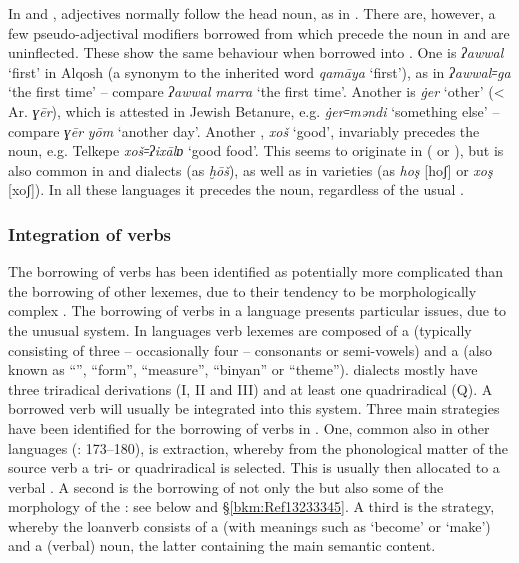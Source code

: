 \documentclass[output=paper]{langsci/langscibook}
\begin{document}
In  and , adjectives normally follow the head noun, as in . There are, however, a few pseudo-adjectival modifiers borrowed from  which precede the noun in  and are uninflected. These show the same behaviour when borrowed into . One is \textit{ʔawwal} ‘first’ in  Alqosh (a synonym to the inherited word \textit{qamāya} ‘first’), as in \textit{ʔawwal꞊ga} ‘the first time’ – compare  \textit{ʔawwal} \textit{marra} ‘the first time’. Another is \textit{\.ger} ‘other’ (<  Ar. \textit{ɣēr}), which is attested in Jewish Betanure, e.g. \textit{\.ger꞊məndi} ‘something else’ \citep[105]{Mutzafi2008} – compare   \textit{ɣēr} \textit{yōm} ‘another day’. Another , \textit{xoš} ‘good’, invariably precedes the noun, e.g.  Telkepe \textit{xoš꞊ʔixālɒ} ‘good food’. This seems to originate in  ( or ), but is also common in  and   dialects (as \textit{ḫōš}), as well as in  varieties (as \textit{hoş} [hoʃ] or \textit{xoş} [xoʃ]). In all these languages it precedes the noun, regardless of the usual .

\subsubsection{\label{bkm:Ref13233110}Integration of verbs}

The borrowing of verbs has been identified as potentially more complicated than the borrowing of other lexemes, due to their tendency to be morphologically complex \citep[175]{Matras2009}. The borrowing of verbs in a  language presents particular issues, due to the unusual  system. In  languages verb lexemes are composed of a  (typically consisting of three – occasionally four – consonants or semi-vowels) and a  (also known as ``'', ``form'', ``measure'', ``binyan'' or ``theme'').  dialects mostly have three triradical derivations (I, II and III) and at least one quadriradical  (Q). A borrowed verb will usually be integrated into this system. Three main strategies have been identified for the borrowing of verbs in . One, common also in other  languages (\citealt{Wohlgemuth2009}: 173–180), is  extraction, whereby from the phonological matter of the source verb a tri- or quadriradical  is selected. This is usually then allocated to a verbal . A second is the borrowing of not only the  but also some of the morphology of the  : see below and §\ref{bkm:Ref13233345}. A third is the  strategy, whereby the loanverb consists of a  (with meanings such as `become' or `make') and a (verbal) noun, the latter containing the main semantic content. 
\end{document}
